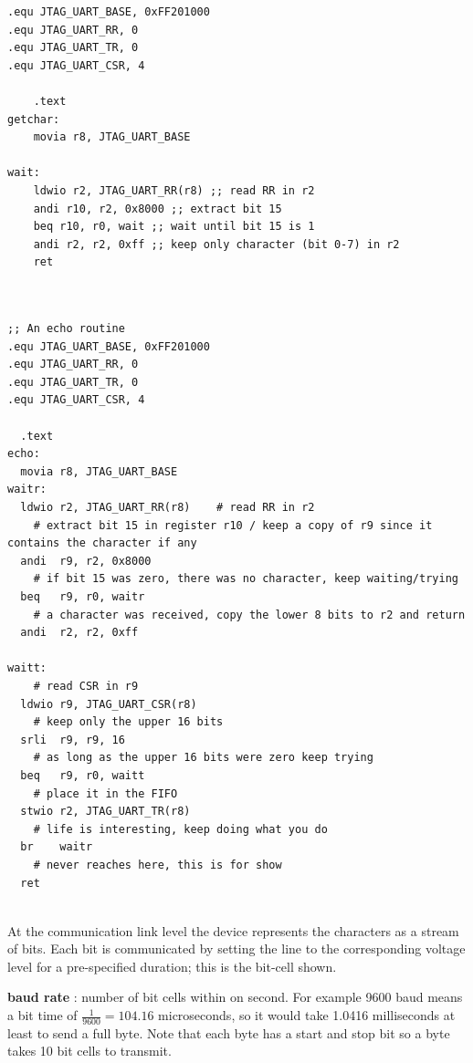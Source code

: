\documentclass[../notes.tex]{subfiles}
\begin{document}
\begin{listing}[H]
\begin{verbatim}
.equ JTAG_UART_BASE, 0xFF201000
.equ JTAG_UART_RR, 0
.equ JTAG_UART_TR, 0
.equ JTAG_UART_CSR, 4

	.text
getchar:
	movia r8, JTAG_UART_BASE

wait:
	ldwio r2, JTAG_UART_RR(r8) ;; read RR in r2
	andi r10, r2, 0x8000 ;; extract bit 15
	beq r10, r0, wait ;; wait until bit 15 is 1
	andi r2, r2, 0xff ;; keep only character (bit 0-7) in r2
	ret



\end{verbatim}
\end{listing}




\begin{listing}[H]
\begin{verbatim}
;; An echo routine
.equ JTAG_UART_BASE, 0xFF201000
.equ JTAG_UART_RR, 0
.equ JTAG_UART_TR, 0
.equ JTAG_UART_CSR, 4

  .text
echo:
  movia r8, JTAG_UART_BASE
waitr:
  ldwio r2, JTAG_UART_RR(r8)    # read RR in r2
	# extract bit 15 in register r10 / keep a copy of r9 since it contains the character if any
  andi  r9, r2, 0x8000          
	# if bit 15 was zero, there was no character, keep waiting/trying
  beq   r9, r0, waitr           
	# a character was received, copy the lower 8 bits to r2 and return
  andi  r2, r2, 0xff            

waitt:
	# read CSR in r9
  ldwio r9, JTAG_UART_CSR(r8)   
	# keep only the upper 16 bits
  srli  r9, r9, 16              
	# as long as the upper 16 bits were zero keep trying
  beq   r9, r0, waitt           
	# place it in the FIFO
  stwio r2, JTAG_UART_TR(r8)    
	# life is interesting, keep doing what you do
  br    waitr                  
	# never reaches here, this is for show
  ret                           


\end{verbatim}
\end{listing}

At the communication link level the device represents the characters as a stream of bits. Each bit is communicated by setting the line to the corresponding voltage level for a pre-specified duration; this is the bit-cell shown.
\begin{definition}
	\textbf{baud rate} : number of bit cells within on second. For example 9600 baud means a bit time of $ \frac{1}{9600} = 104.16$ microseconds, so it would take 1.0416 milliseconds at least to send a full byte. Note that each byte has a start and stop bit so a byte takes 10 bit cells to transmit.
\end{definition}
\end{document}
